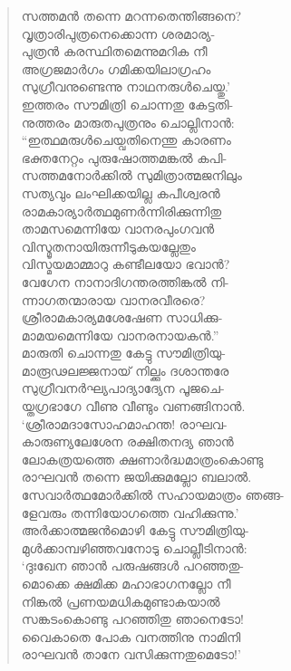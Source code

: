 \begin{verse}
സത്തമന്‍ തന്നെ മറന്നതെന്തിങ്ങനെ?\\
വൃത്രാരിപുത്രനെക്കൊന്ന ശരമാര്യ-\\
പുത്രന്‍ കരസ്ഥിതമെന്നുമറിക നീ\\
അഗ്രജമാര്‍ഗം ഗമിക്കയിലാഗ്രഹം\\
സുഗ്രീവനുണ്ടെന്നു നാഥനരുള്‍ചെയ്തു.’\\
ഇത്തരം സൗമിത്രി ചൊന്നതു കേട്ടതി-\\
നുത്തരം മാരുതപുത്രനും ചൊല്ലിനാന്‍:\\
“ഇത്ഥമരുള്‍ചെയ്വതിനെന്തു കാരണം\\
ഭക്തനേറ്റം പുരുഷോത്തമങ്കല്‍ കപി-\\
സത്തമനോര്‍ക്കില്‍ സുമിത്രാത്മജനിലും\\
സത്യവും ലംഘിക്കയില്ല കപീശ്വരന്‍\\
രാമകാര്യാര്‍ത്ഥമുണര്‍ന്നിരിക്കുന്നിതു\\
താമസമെന്നിയേ വാനരപുംഗവന്‍\\
വിസ്മൃതനായിരുന്നീടുകയല്ലേതും\\
വിസ്മയമാമ്മാറു കണ്ടീലയോ ഭവാന്‍?\\
വേഗേന നാനാദിഗന്തരത്തിങ്കല്‍ നി-\\
ന്നാഗതന്മാരായ വാനരവീരരെ?\\
ശ്രീരാമകാര്യമശേഷേണ സാധിക്കു-\\
മാമയമെന്നിയേ വാനരനായകന്‍.”\\
മാരുതി ചൊന്നതു കേട്ടു സൗമിത്രിയു-\\
മാരൂഢലജ്ജനായ് നില്ക്കും ദശാന്തരേ\\
സുഗ്രീവനര്‍ഘ്യപാദ്യാദ്യേന പൂജചെ-\\
യ്തഗ്രഭാഗേ വീണു വീണ്ടും വണങ്ങിനാന്‍.\\
‘ശ്രീരാമദാസോഹമാഹന്ത! രാഘവ-\\
കാരുണ്യലേശേന രക്ഷിതനദ്യ ഞാന്‍\\
ലോകത്രയത്തെ ക്ഷണാര്‍ദ്ധമാത്രംകൊണ്ടു\\
രാഘവന്‍ തന്നെ ജയിക്കുമല്ലോ ബലാല്‍.\\
സേവാര്‍ത്ഥമോര്‍ക്കില്‍ സഹായമാത്രം ഞങ്ങ-\\
ളേവരും തന്നിയോഗത്തെ വഹിക്കുന്നു.’\\
അര്‍ക്കാത്മജന്‍മൊഴി കേട്ടു സൗമിത്രിയു-\\
മുള്‍ക്കാമ്പഴിഞ്ഞവനോടു ചൊല്ലീടിനാന്‍:\\
‘ദുഃഖേന ഞാന്‍ പരുഷങ്ങള്‍ പറഞ്ഞതു-\\
മൊക്കെ ക്ഷമിക്ക മഹാഭാഗനല്ലോ നീ\\
നിങ്കല്‍ പ്രണയമധികമുണ്ടാകയാല്‍\\
സങ്കടംകൊണ്ടു പറഞ്ഞിതു ഞാനെടോ!\\
വൈകാതെ പോക വനത്തിനു നാമിനി\\
രാഘവന്‍ താനേ വസിക്കുന്നതുമെടോ!’
\end{verse}

